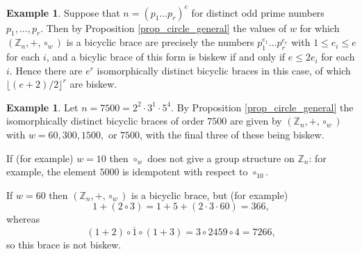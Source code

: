\documentclass[reqno]{amsart}
\theoremstyle{definition}
\newtheorem{example}[theorem]{Example}
\newcommand{\Z}{\mathbb{Z}}
\renewcommand{\bar}{\overline}
\begin{document}
\begin{example}
Suppose that $ n = (p_{1} \ldots p_{r})^{e} $ for distinct odd prime numbers $ p_{1}, \ldots ,p_{r} $. Then by Proposition \ref{prop_circle_general} the values of $ w $ for which $ (\Z_{n},+,\circ_{w}) $ is a bicyclic brace are precisely the numbers $ p_{1}^{e_{1}} \ldots p_{r}^{e_{r}} $ with $ 1 \leq e_{i} \leq e $ for each $ i $, and a bicylic brace of this form is biskew if and only if $ e \leq 2e_{i} $ for each $ i $. Hence there are $ e^{r} $ isomorphically distinct bicyclic braces in this case, of which $ \lfloor (e+2)/2 \rfloor ^{r} $ are biskew. 
\end{example}

\begin{example}
Let $ n = 7500 = 2^2 \cdot 3^1 \cdot 5^4$. By Proposition \ref{prop_circle_general} the isomorphically distinct bicyclic braces of order $ 7500 $ are given by $ (\Z_{n},+,\circ_{w}) $ with $ w=60, 300, 1500, $ or $ 7500 $, with the final three of these being biskew. 

If (for example) $ w = 10 $ then $ \circ_{w} $ does not give a group structure on $ \Z_{n} $: for example, the element $ 5000 $ is idempotent with respect to $ \circ_{10} $. 

If $ w = 60 $ then $ (\Z_{n},+,\circ_{w}) $ is a bicyclic brace, but (for example) 
\[ 1+(2 \circ 3) = 1 + 5 + (2 \cdot 3 \cdot 60) = 366, \]
whereas 
\[  (1 + 2) \circ \bar{1} \circ (1+3) = 3 \circ 2459 \circ 4 = 7266, \]
so this brace is not biskew. 
\end{example}





\end{document}
